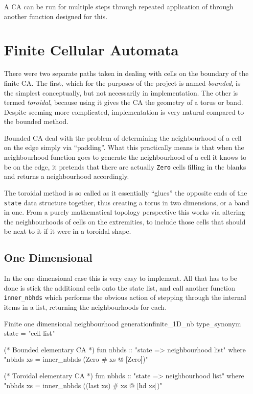 A CA can be run for multiple steps through repeated application of  through another function designed for this.


\section{Finite Cellular Automata} \label{sec:finite_CA}

There were two separate paths taken in dealing with cells on the boundary of the finite CA.
The first,
which for the purposes of the project is named \emph{bounded},
is the simplest conceptually,
but not necessarily in implementation.
The other is termed \emph{toroidal},
because using it gives the CA the geometry of a torus or band.
Despite seeming more complicated,
implementation is very natural compared to the bounded method.

Bounded CA deal with the problem of determining the neighbourhood of a cell on the edge simply via ``padding''.
What this practically means is that when the neighbourhood function goes to generate the neighbourhood of a cell it knows to be on the edge,
it pretends that there are actually \texttt{Zero} cells filling in the blanks and returns a neighbourhood accordingly.

The toroidal method is so called as it essentially ``glues'' the opposite ends of the \texttt{state} data structure together,
thus creating a torus in two dimensions,
or a band in one.
From a purely mathematical topology perspective this works via altering the neighbourhoods of cells on the extremities,
to include those cells that should be next to it if it were in a toroidal shape.


\subsection{One Dimensional} 

In the one dimensional case this is very easy to implement.
All that has to be done is stick the additional cells onto the state list,
and call another function \texttt{inner_nbhds} which performs the obvious action of stepping through the internal items in a list,
returning the neighbourhoods for each.

\begin{myminted}{Finite one dimensional neighbourhood generation}{finite_1D_nb}
    type_synonym state = "cell list"

    (* Bounded elementary CA *)
    fun nbhds :: "state => neighbourhood list" where
    "nbhds  xs = inner_nbhds (Zero # xs @ [Zero])"

    (* Toroidal elementary CA *)
    fun nbhds :: "state => neighbourhood list" where
    "nbhds xs = inner_nbhds ((last xs) # xs @ [hd xs])"
\end{myminted}

